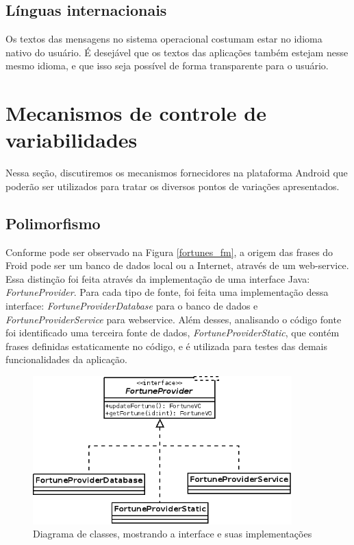 \subsection{Línguas internacionais}
Os textos das mensagens no sistema operacional costumam estar no idioma nativo do usuário.
É desejável que os textos das aplicações também estejam nesse mesmo idioma, e que 
isso seja possível de forma transparente para o usuário.

\section{Mecanismos de controle de variabilidades}

Nessa seção, discutiremos os mecanismos fornecidores na plataforma Android que 
poderão ser utilizados para tratar os diversos pontos de variações apresentados.

\subsection{Polimorfismo}

Conforme pode ser observado na Figura \ref{fortunes_fm}, a origem das frases do 
Froid pode ser um banco de dados local ou a Internet, através de um web-service.
Essa distinção foi feita através da implementação de uma interface Java: 
{\it FortuneProvider}.
Para cada tipo de fonte, foi feita uma implementação dessa interface: 
{\it FortuneProviderDatabase} para o banco de dados e {\it FortuneProviderService} para webservice. 
Além desses, analisando o código fonte foi identificado uma terceira fonte de dados, 
{\it FortuneProviderStatic}, que contém frases definidas estaticamente no código, e é 
utilizada para testes das demais funcionalidades da aplicação.

\begin{figure}[h]
    \centering
    \includegraphics[width=10cm]{img/implementacao_FortuneProvider}
    \caption{Diagrama de classes, mostrando a interface e suas implementações}
    \label{diagrama_classes}
\end{figure}

